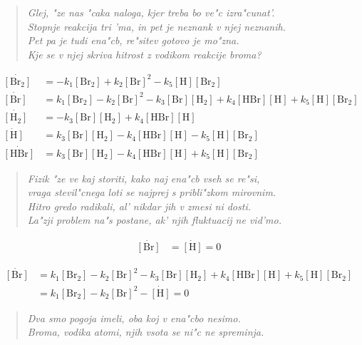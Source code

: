 \documentclass[a4paper,10pt]{article}
\begin{document}
\begin{verse}
\textit{Glej, "ze nas "caka naloga, kjer treba bo ve"c izra"cunat'.  \\
Stopnje reakcija tri 'ma, in pet je neznank v njej neznanih. \\
Pet pa je tudi ena"cb, re"sitev gotovo je mo"zna. \\
Kje se v njej skriva hitrost z vodikom reakcije broma?  }
\end{verse}

\begin{align}
 \dot{[\mathrm{Br_2}]} &= - k_1 [\mathrm{Br_2}] + k_2 [\mathrm{Br}]^2 - k_5 [\mathrm{H}] [\mathrm{Br_2}] \\
 \dot{[\mathrm{Br}]} &= k_1 [\mathrm{Br_2}] - k_2 [\mathrm{Br}]^2 - k_3 [\mathrm{Br}] [\mathrm{H_2}] + k_4 [\mathrm{HBr}] [\mathrm{H}] + k_5 [\mathrm{H}] [\mathrm{Br_2}]\\
 \dot{[\mathrm{H_2}]} &= - k_3 [\mathrm{Br}] [\mathrm{H_2}] + k_4 [\mathrm{HBr}] [\mathrm{H}] \\
 \dot{[\mathrm{H}]} &= k_3 [\mathrm{Br}] [\mathrm{H_2}] - k_4 [\mathrm{HBr}] [\mathrm{H}] - k_5 [\mathrm{H}] [\mathrm{Br_2}]\\
\dot{[\mathrm{HBr}]} &= k_3 [\mathrm{Br}] [\mathrm{H_2}] - k_4 [\mathrm{HBr}] [\mathrm{H}] + k_5 [\mathrm{H}] [\mathrm{Br_2}]
\end{align}

\begin{verse}
\textit{Fizik "ze ve kaj storiti, kako naj ena"cb vseh se re"si, \\
vraga stevil"cnega loti se najprej s pribli"zkom mirovnim. \\
Hitro gredo radikali, al' nikdar jih v zmesi ni dosti. \\
La"zji problem na"s postane, ak' njih fluktuacij ne vid'mo. 
}
\end{verse}

\begin{align}
 \dot{[\mathrm{Br}]} &= \dot{[\mathrm{H}]} = 0
\end{align}

\begin{align}
 \dot{[\mathrm{Br}]} &= k_1 [\mathrm{Br_2}] - k_2 [\mathrm{Br}]^2 - k_3 [\mathrm{Br}] [\mathrm{H_2}] + k_4 [\mathrm{HBr}] [\mathrm{H}] + k_5 [\mathrm{H}] [\mathrm{Br_2}]  \\
  &= k_1 [\mathrm{Br_2}] - k_2 [\mathrm{Br}]^2 - \dot{[\mathrm{H}]} = 0
\end{align}

\begin{verse}
\textit{Dva smo pogoja imeli, oba koj v ena"cbo nesimo. \\
Broma, vodika atomi, njih vsota se ni"c ne spreminja. }
\end{verse}
\end{document}
